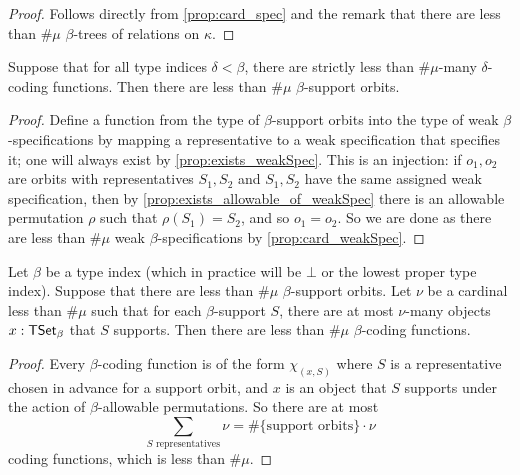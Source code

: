 \begin{proof}
  Follows directly from \cref{prop:card_spec} and the remark that there are less than \( \#\mu \) \( \beta \)-trees of relations on \( \kappa \).
\end{proof}
\begin{proposition}
  \label{prop:card_supportOrbit}
  Suppose that for all type indices \( \delta < \beta \), there are strictly less than \( \#\mu \)-many \( \delta \)-coding functions.
  Then there are less than \( \#\mu \) \( \beta \)-support orbits.
\end{proposition}
\begin{proof}
  Define a function from the type of \( \beta \)-support orbits into the type of weak \( \beta \)-specifications by mapping a representative to a weak specification that specifies it; one will always exist by \cref{prop:exists_weakSpec}.
  This is an injection: if \( o_1, o_2 \) are orbits with representatives \( S_1, S_2 \) and \( S_1, S_2 \) have the same assigned weak specification, then by \cref{prop:exists_allowable_of_weakSpec} there is an allowable permutation \( \rho \) such that \( \rho(S_1) = S_2 \), and so \( o_1 = o_2 \).
  So we are done as there are less than \( \#\mu \) weak \( \beta \)-specifications by \cref{prop:card_weakSpec}.
\end{proof}
\begin{proposition}
  \label{prop:card_codingFunction_of_card_supports}
  Let \( \beta \) be a type index (which in practice will be \( \bot \) or the lowest proper type index).
  Suppose that there are less than \( \#\mu \) \( \beta \)-support orbits.
  Let \( \nu \) be a cardinal less than \( \#\mu \) such that for each \( \beta \)-support \( S \), there are at most \( \nu \)-many objects \( x : \mathsf{TSet}_\beta \) that \( S \) supports.
  Then there are less than \( \#\mu \) \( \beta \)-coding functions.
\end{proposition}
\begin{proof}
  Every \( \beta \)-coding function is of the form \( \chi_{(x, S)} \) where \( S \) is a representative chosen in advance for a support orbit, and \( x \) is an object that \( S \) supports under the action of \( \beta \)-allowable permutations.
  So there are at most
  \[ \sum_{S \text{ representatives}} \nu = \#\{\text{support orbits}\} \cdot \nu \]
  coding functions, which is less than \( \#\mu \).
\end{proof}

